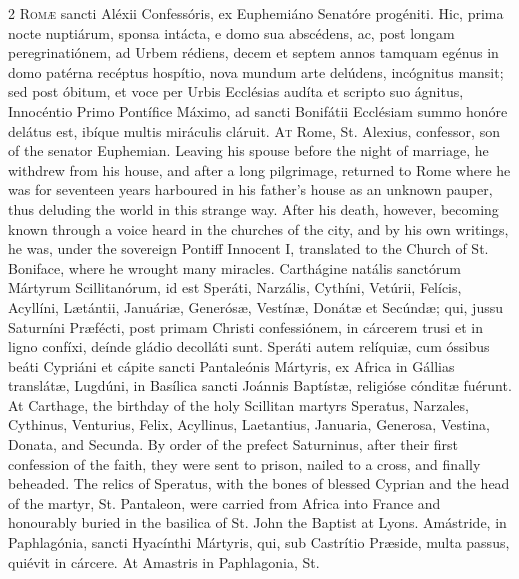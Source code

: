 \begin{paracol}{2}
\lettrine[lines=2]{R}{omæ} sancti Aléxii 
 Confessóris, ex Euphemiáno Senatóre progéniti. Hic, prima nocte 
 nuptiárum, sponsa intácta, e domo sua abscédens, ac, post longam 
 peregrinatiónem, ad Urbem rédiens, decem et septem annos tamquam egénus in 
 domo patérna recéptus hospítio, nova mundum arte delúdens, incógnitus mansit; 
 sed post óbitum, et voce per Urbis Ecclésias audíta et scripto suo ágnitus, 
 Innocéntio Primo Pontífice Máximo, ad sancti Bonifátii Ecclésiam summo 
 honóre delátus est, ibíque multis miráculis cláruit.
\switchcolumn
{}
\lettrine[lines=2]{A}{t} Rome, St. Alexius, confessor, son 
 of the senator Euphemian. Leaving his spouse before the night of 
 marriage, he withdrew from his house, and after a long pilgrimage, returned 
 to Rome where he was for seventeen years harboured in his father's house as 
 an unknown pauper, thus deluding the world in this strange way. After 
 his death, however, becoming known through a voice heard in the churches of 
 the city, and by his own writings, he was, under the sovereign Pontiff 
 Innocent I, translated to the Church of St. Boniface, where he wrought many 
 miracles.
\switchcolumn*
{}
Carthágine natális 
 sanctórum Mártyrum Scillitanórum, id est Speráti, Narzális, Cythíni, Vetúrii, 
 Felícis, Acyllíni, Lætántii, Januáriæ, Generósæ, Vestínæ, Donátæ et Secúndæ; 
 qui, jussu Saturníni Præfécti, post primam Christi confessiónem, in cárcerem 
 trusi et in ligno confíxi, deínde gládio decolláti sunt. Speráti autem 
 relíquiæ, cum óssibus beáti Cypriáni et cápite sancti Pantaleónis Mártyris, 
 ex Africa in Gállias translátæ, Lugdúni, in Basílica sancti Joánnis Baptístæ, 
 religióse cónditæ fuérunt.
\switchcolumn
{}
At Carthage, the birthday of the 
 holy Scillitan martyrs Speratus, Narzales, Cythinus, Venturius, Felix, 
 Acyllinus, Laetantius, Januaria, Generosa, Vestina, Donata, and Secunda. 
 By order of the prefect Saturninus, after their first confession of the 
 faith, they were sent to prison, nailed to a cross, and finally beheaded. 
 The relics of Speratus, with the bones of blessed Cyprian and the head of 
 the martyr, St. Pantaleon, were carried from Africa into France and 
 honourably buried in the basilica of St. John the Baptist at Lyons.
\switchcolumn*
{}
Amástride, in 
 Paphlagónia, sancti Hyacínthi Mártyris, qui, sub Castrítio Præside, multa 
 passus, quiévit in cárcere.
\switchcolumn
{}
At Amastris in Paphlagonia, St. 

\end{paracol}
